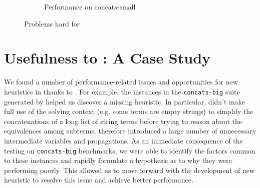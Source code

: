\begin{figure}[h]
\begin{subfigure}{.5\textwidth}
            \label{fig:concats-small}
            \vspace{-0.25in}
            \caption{Performance on concats-small}
        \end{subfigure}
        \vspace{-0.1in}
        \caption{Problems hard for \us{}}
        \label{fig:z3str3-hard}
        \vspace{-0.3in}
    \end{figure}

    
\section{Usefulness to \us{}: A Case Study}
\label{sec:analysis}

We found a number of performance-related issues and opportunities for
new heuristics in \us{} thanks to \fuzzer{}. For example, the
instances in the \texttt{concats-big} suite generated by \fuzzer{}
helped us discover a missing heuristic. In particular, \us{} didn't
make full use of the solving context (e.g. some terms are empty
strings) to simplify the concatenations of a long list of string terms
before trying to reason about the equivalences among subterms. \us{}
therefore introduced a large number of unnecessary intermediate
variables and propagations.  As an immediate consequence of the
testing \us{} on \texttt{concats-big} benchmarks, we were able to
identify the factors common to these instances and rapidly formulate a
hypothesis as to why they were performing poorly. This allowed us to
move forward with the development of new heuristic to resolve this
issue and achieve better performance.

        


